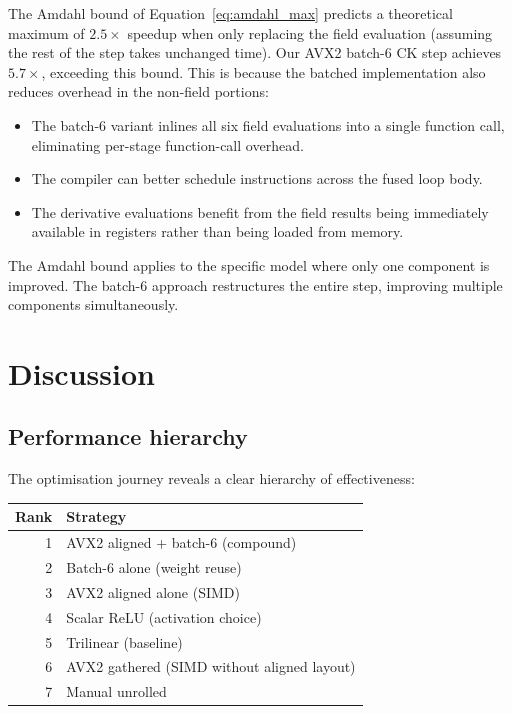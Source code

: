 \documentclass[11pt,a4paper]{article}
\begin{document}
The Amdahl bound of Equation~\ref{eq:amdahl_max} predicts a
theoretical maximum of $2.5\times$ speedup when only replacing the
field evaluation (assuming the rest of the step takes unchanged time).
Our AVX2 batch-6 CK step achieves $5.7\times$, exceeding this bound.
This is because the batched implementation also reduces overhead in
the non-field portions:

\begin{itemize}
    \item The batch-6 variant inlines all six field evaluations into a
          single function call, eliminating per-stage function-call
          overhead.
    \item The compiler can better schedule instructions across the
          fused loop body.
    \item The derivative evaluations benefit from the field results
          being immediately available in registers rather than being
          loaded from memory.
\end{itemize}

The Amdahl bound applies to the specific model where only one
component is improved.  The batch-6 approach restructures the entire
step, improving multiple components simultaneously.


\section{Discussion}
\label{sec:discussion}

\subsection{Performance hierarchy}

The optimisation journey reveals a clear hierarchy of effectiveness:

\begin{center}
\begin{tabular}{rl}
\toprule
Rank & Strategy \\
\midrule
1 & AVX2 aligned + batch-6 (compound) \\
2 & Batch-6 alone (weight reuse) \\
3 & AVX2 aligned alone (SIMD) \\
4 & Scalar ReLU (activation choice) \\
5 & Trilinear (baseline) \\
6 & AVX2 gathered (SIMD without aligned layout) \\
7 & Manual unrolled \\
\bottomrule
\end{tabular}
\end{center}
\end{document}
